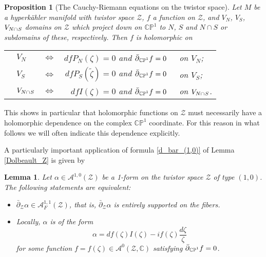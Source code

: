 \documentclass[11pt]{amsart}
\newtheorem{lemma}[theorem]{Lemma}
\newtheorem{proposition}[theorem]{Proposition}
\theoremstyle{remark}
\theoremstyle{remark}
\theoremstyle{definition}
\theoremstyle{definition}
\theoremstyle{definition}
\newcommand{\0}{{\scriptstyle 0'}} %
\newcommand{\1}{{\scriptstyle 1'}}
\newcommand{\hp}{\hspace{0.5pt}} %
\begin{document}
\begin{proposition}[The Cauchy-Riemann equations on the twistor space] \label{CR_Z}
Let $M$ be a hyperk\"ahler manifold with twistor space $\mathcal{Z}$, $f$ a function on $\mathcal{Z}$, and $V_N$, $V_S$, $V_{N \cap \hp S}$ domains on $\mathcal{Z}$ which project down on $\mathbb{CP}^1$ to $N$, $S$ and $N \cap S$  or subdomains of these, respectively. Then $f$ is holomorphic on
\begin{flushleft}
\begin{tabular}{llcr@{\hskip 0pt}l}
\hspace{10pt} & $V_N$ & $\Leftrightarrow$ & $df P_N(\zeta) = 0$ and $\bar{\partial}_{\hp\smash{\mathbb{CP}^1}} f = 0$ & \ on $V_N$; \\[2pt]
& $V_S$ & $\Leftrightarrow$ & $df P_S(\tilde{\zeta}) = 0$ and $\bar{\partial}_{\hp\smash{\mathbb{CP}^1}} f = 0$ & \ on $V_S$; \\[3pt]
& $V_{N \cap \hp S}$ & $\Leftrightarrow$ & $df I(\zeta) = 0$ and $\bar{\partial}_{\hp\smash{\mathbb{CP}^1}} f = 0$ & \ on $V_{N \cap \hp S}$.
\end{tabular}
\end{flushleft}
\end{proposition}

\noindent This shows in particular that holomorphic functions on $\mathcal{Z}$ must necessarily have a holomorphic dependence on the complex $\mathbb{CP}^1$ coordinate. For this reason in what follows we will often indicate this dependence explicitly. 

A particularly important application of formula \eqref{d_bar_(1,0)} of Lemma \ref{Dolbeault_Z} is given by 

\begin{lemma} \label{fiberwise-lemma}
Let \mbox{$\alpha \in \mathscr{A}^{1,0}(\mathcal{Z})$} be a 1-form on the twistor space $\mathcal{Z}$ of type $(1,0)$. The following statements are equivalent:
\begin{itemize}
\setlength\itemsep{0.4em}
\item[1.] $\bar{\partial}_{\mathcal{Z}}\alpha \in \mathscr{A}_F^{1,1}(\mathcal{Z})$, that is, $\bar{\partial}_{\mathcal{Z}}\alpha$ is entirely supported on the fibers.
\item[2.] Locally, $\alpha$ is of the form
\begin{equation}
\alpha = df(\zeta) I(\zeta) - i f(\zeta) \frac{d\zeta}{\zeta}
\end{equation}
for some function $f = f(\zeta) \in \mathscr{A}^0(\mathcal{Z},\mathbb{C})$ satisfying $\bar{\partial}_{\hp\smash{\mathbb{CP}^1}} f = 0$. 
\end{itemize}
\end{lemma}
\end{document}
